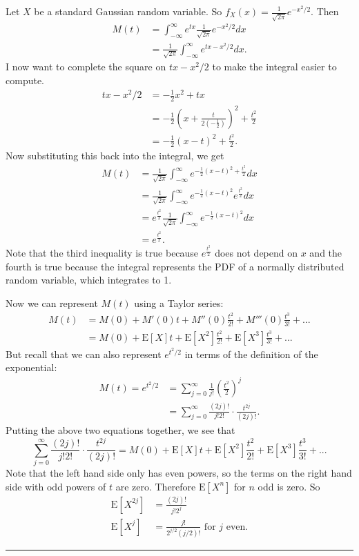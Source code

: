 \documentclass{article}
\theoremstyle{break}
\newenvironment{solution}{{\bf Solution:}}{\hfill\rule{2mm}{2mm}}
\newcommand{\E}{\mathrm{E}}
\begin{document}
\begin{solution}
Let $X$ be a standard Gaussian random variable. So $f_X(x) = \frac{1}{\sqrt{2 \pi}}  e^{-x^2/2}$.
Then
\begin{align*}
M(t) &= \int_{-\infty}^\infty e^{tx} \frac{1}{\sqrt{2 \pi}}  e^{-x^2/2} dx \\
&= \frac{1}{\sqrt{2 \pi}} \int_{-\infty}^\infty e^{tx -x^2/2} dx.
\end{align*}
I now want to complete the square on $tx -x^2/2$ to make the integral easier to compute.
\begin{align*}
tx -x^2/2 &= - \frac{1}{2}x^2 + tx \\
	&= -\frac{1}{2} \left( x + \frac{t}{2 (-\frac{1}{2})} \right)^2 + \frac{t^2}{2} \\
	&= - \frac{1}{2} (x - t)^2 + \frac{t^2}{2}.
\end{align*}
Now substituting this back into the integral, we get
\begin{align*}
M(t) &= \frac{1}{\sqrt{2 \pi}} \int_{-\infty}^\infty e^{- \frac{1}{2} (x - t)^2 + \frac{t^2}{2}} dx \\
&= \frac{1}{\sqrt{2 \pi}} \int_{-\infty}^\infty e^{- \frac{1}{2} (x - t)^2} e^{\frac{t^2}{2}} dx \\
&=  e^{\frac{t^2}{2}} \frac{1}{\sqrt{2 \pi}} \int_{-\infty}^\infty e^{- \frac{1}{2} (x - t)^2}  dx \\
&= e^{\frac{t^2}{2}}.
\end{align*}
Note that the third inequality is true because $e^{\frac{t^2}{2}}$ does not depend  on $x$ and the fourth is true because the integral represents the PDF of a normally distributed random variable, which integrates to 1.

Now we can represent $M(t)$ using a Taylor series:
\begin{align*}
M(t) &= M(0) + M'(0) t + M''(0) \frac{t^2}{2!} + M'''(0) \frac{t^3}{3!} + ... \\
&= M(0) + \E[X] t + \E[X^2] \frac{t^2}{2!} +  \E[X^3] \frac{t^3}{3!} + ...
\end{align*}
But recall that we can also represent $e^{t^2/2}$ in terms of the definition of the exponential:
\begin{align*}
M(t) = e^{t^2/2} &= \sum_{j=0}^\infty \frac{1}{j!} \left(\frac{t^2}{2}\right)^j \\
&= \sum_{j=0}^\infty \frac{(2j)!}{j! 2!} \cdot \frac{t^{2j}}{(2j)!}.
\end{align*} 
Putting the above two equations together, we see that
\[\sum_{j=0}^\infty \frac{(2j)!}{j! 2!} \cdot \frac{t^{2j}}{(2j)!} = M(0) + \E[X] t + \E[X^2] \frac{t^2}{2!} +  \E[X^3] \frac{t^3}{3!} + ...
\]
Note that the left hand side only has even powers, so the terms on the right hand side with odd powers of $t$ are zero. Therefore $\E[X^n]$ for $n$ odd is zero. So 
\begin{align*}
\E[X^{2j}] &= \frac{(2j)!}{j!2^j} \\
\E[X^j] &= \frac{j!}{2^{j/2} (j/2)!} \text{ for } j \text{ even.}
\end{align*}
\end{solution}
\end{document}
